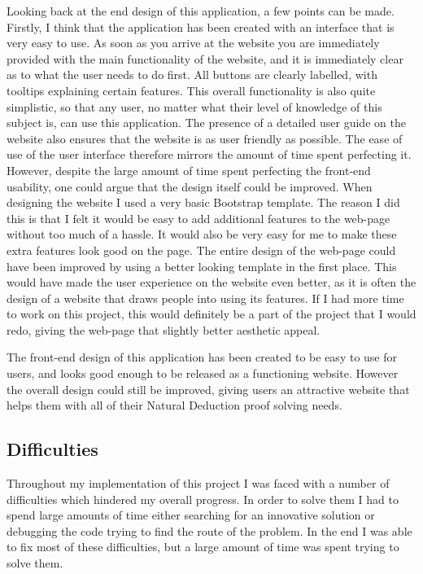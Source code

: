 Looking back at the end design of this application, a few points can be made. Firstly, I think that the application has been created with an interface that is very easy to use. As soon as you arrive at the website you are immediately provided with the main functionality of the website, and it is immediately clear as to what the user needs to do first. All buttons are clearly labelled, with tooltips explaining certain features. This overall functionality is also quite simplistic, so that any user, no matter what their level of knowledge of this subject is, can use this application. The presence of a detailed user guide on the website also ensures that the website is as user friendly as possible. The ease of use of the user interface therefore mirrors the amount of time spent perfecting it. However, despite the large amount of time spent perfecting the front-end usability, one could argue that the design itself could be improved. When designing the website I used a very basic Bootstrap template. The reason I did this is that I felt it would be easy to add additional features to the web-page without too much of a hassle. It would also be very easy for me to make these extra features look good on the page. The entire design of the web-page could have been improved by using a better looking template in the first place. This would have made the user experience on the website even better, as it is often the design of a website that draws people into using its features. If I had more time to work on this project, this would definitely be a part of the project that I would redo, giving the web-page that slightly better aesthetic appeal.

The front-end design of this application has been created to be easy to use for users, and looks good enough to be released as a functioning website. However the overall design could still be improved, giving users an attractive website that helps them with all of their Natural Deduction proof solving needs.

\subsection{Difficulties \label{difficulties}}

Throughout my implementation of this project I was faced with a number of difficulties which hindered my overall progress. In order to solve them I had to spend large amounts of time either searching for an innovative solution or debugging the code trying to find the route of the problem. In the end I was able to fix most of these difficulties, but a large amount of time was spent trying to solve them.

